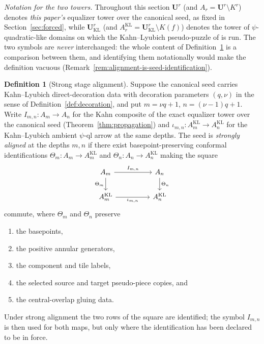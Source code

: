 \documentclass[11pt,reqno]{amsart}
\theoremstyle{definition}
\newtheorem{definition}[theorem]{Definition}
\theoremstyle{remark}
\begin{document}
\emph{Notation for the two towers.}  Throughout this section
$\mathbf U^{r}$ (and $A_{r}=\mathbf U^{r}\setminus K^{r}$) denotes
\emph{this paper's} equalizer tower over the canonical seed, as fixed
in Section~\ref{sec:forced}, while
$\mathbf U_{\mathrm{KL}}^{r}$ (and
$A^{\mathrm{KL}}_{r}=\mathbf U_{\mathrm{KL}}^{r}\setminus K(f)$)
denotes the tower of $\psi$-quadratic-like domains on which the
Kahn--Lyubich pseudo-puzzle of
\cite[\S3.2]{KLDecorations08} is run.  The two symbols are
\emph{never} interchanged: the whole content of
Definition~\ref{def:strong-alignment} is a comparison between them,
and identifying them notationally would make the definition vacuous
(Remark~\ref{rem:alignment-is-seed-identification}).

\begin{definition}[Strong stage alignment]\label{def:strong-alignment}
Suppose the canonical seed carries Kahn--Lyubich direct-decoration
data with decoration parameters $(q,\nu)$ in the sense of
Definition~\ref{def:decoration}, and put
$m=\nu q+1$, $n=(\nu-1)q+1$.  Write $I_{m,n}\colon A_{m}\to A_{n}$ for
the Kahn composite of the exact equalizer tower over the canonical
seed (Theorem~\ref{thm:propagation}) and
$\iota_{m,n}\colon A^{\mathrm{KL}}_{m}\to A^{\mathrm{KL}}_{n}$ for the
Kahn--Lyubich ambient $\psi$-ql arrow at the same depths.  The seed is
\emph{strongly aligned} at the depths $m,n$ if there exist
basepoint-preserving conformal identifications
$\Theta_{m}\colon A_{m}\to A^{\mathrm{KL}}_{m}$ and
$\Theta_{n}\colon A_{n}\to A^{\mathrm{KL}}_{n}$ making the
square
\[
\begin{tikzcd}[column sep=huge]
A_{m}\arrow[r,"I_{m,n}"]\arrow[d,"\Theta_{m}"'] &
A_{n}\arrow[d,"\Theta_{n}"]\\
A^{\mathrm{KL}}_{m}\arrow[r,"\iota_{m,n}"'] &
A^{\mathrm{KL}}_{n}
\end{tikzcd}
\]
commute, where $\Theta_{m}$ and $\Theta_{n}$ preserve
\begin{enumerate}
\item[(i)] the basepoints,
\item[(ii)] the positive annular generators,
\item[(iii)] the component and tile labels,
\item[(iv)] the selected source and target pseudo-piece copies, and
\item[(v)] the central-overlap gluing data.
\end{enumerate}
Under strong alignment the two rows of the square are identified; the
symbol $I_{m,n}$ is then used for both maps, but only where the
identification has been declared to be in force.
\end{definition}
\end{document}
